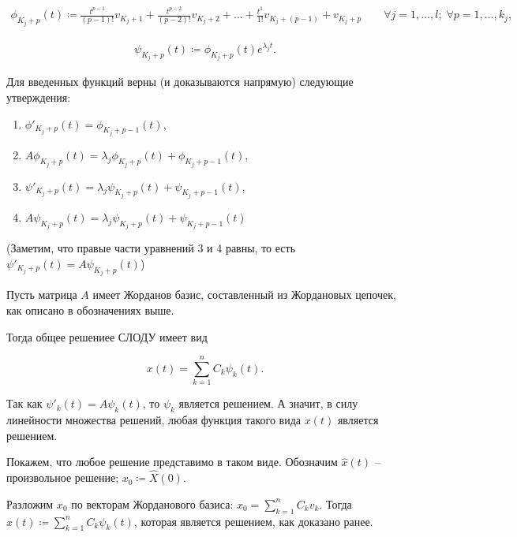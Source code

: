 \begin{align*}
    \phi_{K_j+p}(t) \coloneqq \frac{t^{p-1}}{(p-1)!} v_{K_j + 1} + \frac{t^{p-2}}{(p-2)!} v_{K_j + 2} + \dots + \frac{t^1}{1!} v_{K_j + (p-1)} + v_{K_j + p} \qquad \forall j = 1, \dots, l;\; \forall p = 1, \dots, k_j,
\end{align*}

\begin{align*}
    \psi_{K_j + p}(t) \coloneqq \phi_{K_j+p}(t) e^{\lambda_j t}.
\end{align*}

\Th Для введенных функций верны (и доказываются напрямую) следующие утверждения:

\begin{enumerate}
    \item $\phi'_{K_j+p}(t) = \phi_{K_j+p-1}(t)$,
    \item $A\phi_{K_j+p}(t) = \lambda_j \phi_{K_j+p}(t) + \phi_{K_j+p-1}(t)$,
    \item $\psi'_{K_j+p}(t) = \lambda_j \psi_{K_j+p}(t) + \psi_{K_j+p-1}(t)$,
    \item $A\psi_{K_j+p}(t) = \lambda_j \psi_{K_j+p}(t) + \psi_{K_j+p-1}(t)$
\end{enumerate}

(Заметим, что правые части уравнений 3 и 4 равны, то есть $\psi'_{K_j+p}(t) = A\psi_{K_j+p}(t)$)


Пусть матрица $A$ имеет Жорданов базис, составленный из Жордановых цепочек, как описано в обозначениях выше.

Тогда общее решениее СЛОДУ имеет вид

\begin{equation*}
    x(t) = \sum_{k=1}^n C_k \psi_k(t).
\end{equation*}

\Proof

Так как $\psi'_k(t) = A\psi_k(t)$, то $\psi_k$ является решением.
А значит, в силу линейности множества решений, любая функция такого вида $x(t)$ является решением.

Покажем, что любое решение представимо в таком виде.
Обозначим $\hat{x}(t)$ -- произвольное решение; $x_0 \coloneqq \hat{X}(0)$.

Разложим $x_0$ по векторам Жорданового базиса: $x_0 = \sum_{k=1}^n C_k v_k$.
Тогда $x(t) \coloneqq \sum_{k=1}^n C_k \psi_k(t)$, которая является решением, как доказано ранее.

